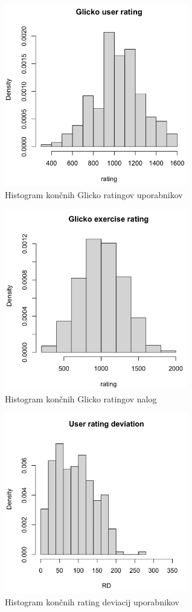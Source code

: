 \documentclass{IEEEtran}
\begin{document}
\begin{figure}[h!]
    \includegraphics[width=8cm]{GlickoUser}
    \caption{Histogram končnih Glicko ratingov uporabnikov}%
    \label{fig:example}%
\end{figure}
\begin{figure}[h!]
    \includegraphics[width=8cm]{GlickoExercise}
    \caption{Histogram končnih Glicko ratingov nalog}%
    \label{fig:example}%
\end{figure}
\begin{figure}[h!]
    \includegraphics[width=8cm]{RDUser}
    \caption{Histogram končnih rating deviacij uporabnikov}%
    \label{fig:example}%
\end{figure}
\end{document}
